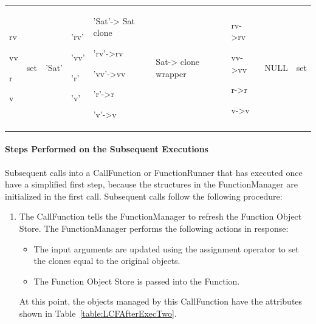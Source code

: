 \begin{center}
\begin{supertabular}{|p{0.5in}|p{0.5in}|p{0.4in}|p{0.4in}|p{0.5in}|p{0.68in}|p{0.67in}|p{0.5in}|
p{0.5in}|}
\begin{small}
rv

vv

r

v
\end{small} &
\begin{small}
set
\end{small} &
\begin{small}
'Sat'
\end{small} &
\begin{small}
'rv'

'vv'

'r'

'v'
\end{small} &
\begin{small}
'Sat'-> Sat clone

'rv'->rv

'vv'->vv

'r'->r

'v'->v
\end{small} &
\begin{small}
Sat-> clone wrapper
\end{small} &
\begin{small}
rv->rv

vv->vv

r->r

v->v
\end{small} &
\begin{small}
NULL
\end{small} &
\begin{small}
set
\end{small} \\
\end{supertabular}
\end{center}

\paragraph{Steps Performed on the Subsequent Executions}  Subsequent calls into a CallFunction or
FunctionRunner that has executed once have a simplified first step, because the structures in the
FunctionManager are initialized in the first call.  Subsequent calls follow the following procedure:

\begin{enumerate}
\item The CallFunction tells the FunctionManager to refresh the Function Object Store.  The
FunctionManager performs the following actions in response:
\begin{itemize}
\item The input arguments are updated using the assignment operator to set the clones equal to the
original objects.
\item The Function Object Store is passed into the Function.
\end{itemize}

\noindent At this point, the objects managed by this CallFunction have the attributes shown in
Table~\ref{table:LCFAfterExecTwo}.
\end{enumerate}

